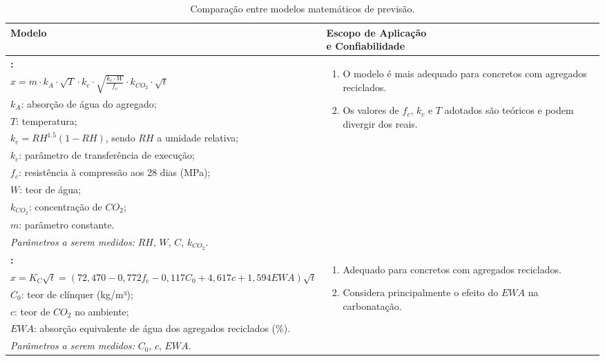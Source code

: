 \begin{table}[H]
\centering
\scriptsize %
\setlength{\tabcolsep}{3pt} %
\renewcommand{\arraystretch}{0.9} %
\caption{Comparação entre modelos matemáticos de previsão.}
\label{tab:modelos_carbonatacao}
\begin{tabular}{p{} p{}}
\toprule
\textbf{Modelo} & \makecell{\textbf{Escopo de Aplicação} \\ \textbf{e Confiabilidade}} \\
\midrule

\textbf{\textcite{zhang_prediction_2018}:} & 
\multirow{9}{6cm}[0pt]{%
\begin{enumerate}[leftmargin=*]
\item O modelo é mais adequado para concretos com agregados reciclados.
\item Os valores de $f_c$, $k_c$ e $T$ adotados são teóricos e podem divergir dos reais.
\end{enumerate}} \\[1mm]
$x = m \cdot k_A \cdot \sqrt{T} \cdot k_e \cdot \sqrt{\frac{k_c \cdot W}{f_c}} \cdot k_{CO_2} \cdot \sqrt{t}$ \\[0.5mm]
$k_A$: absorção de água do agregado; \\
$T$: temperatura; \\
$k_e = RH^{1.5}(1 - RH)$, sendo $RH$ a umidade relativa; \\
$k_c$: parâmetro de transferência de execução; \\
$f_c$: resistência à compressão aos 28 dias (MPa); \\
$W$: teor de água; \\
$k_{CO_2}$: concentração de $CO_2$; \\
$m$: parâmetro constante. \\[0.5mm]
\textit{Parâmetros a serem medidos:} $RH$, $W$, $C$, $k_{CO_2}$. \\[1mm]
\midrule

\textbf{\textcite{silva_statistical_2016}:} &
\multirow{6}{6cm}[0pt]{%
\begin{enumerate}[leftmargin=*]
\item Adequado para concretos com agregados reciclados.
\item Considera principalmente o efeito do $EWA$ na carbonatação.
\end{enumerate}} \\[1mm]
$x = K_C \sqrt{t} = (72{,}470 - 0{,}772f_c - 0{,}117C_0 + 4{,}617c + 1{,}594EWA)\sqrt{t}$ \\
$C_0$: teor de clínquer (kg/m³); \\
$c$: teor de $CO_2$ no ambiente; \\
$EWA$: absorção equivalente de água dos agregados reciclados (\%). \\[0.5mm]
\textit{Parâmetros a serem medidos:} $C_0$, $c$, $EWA$. \\[1mm]
\midrule


\end{tabular}
\end{table}
